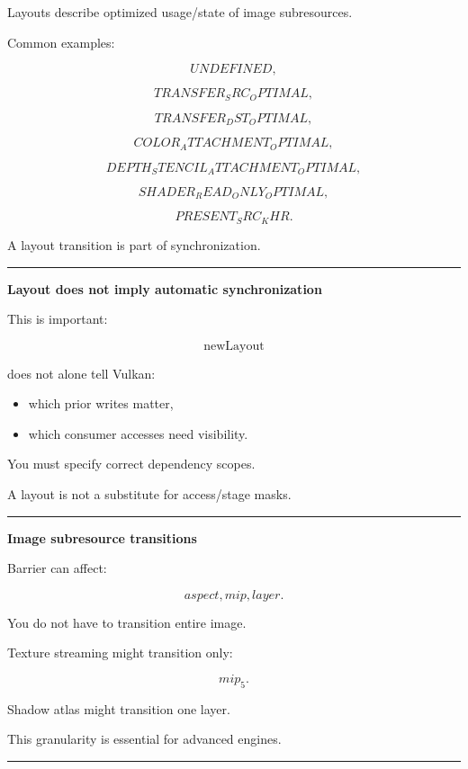 Layouts describe optimized usage/state of image subresources.

Common examples:

\[
UNDEFINED,
\]

\[
TRANSFER_SRC_OPTIMAL,
\]

\[
TRANSFER_DST_OPTIMAL,
\]

\[
COLOR_ATTACHMENT_OPTIMAL,
\]

\[
DEPTH_STENCIL_ATTACHMENT_OPTIMAL,
\]

\[
SHADER_READ_ONLY_OPTIMAL,
\]

\[
PRESENT_SRC_KHR.
\]

A layout transition is part of synchronization.

\begin{center}\rule{0.5\linewidth}{0.5pt}\end{center}

\textbf{Layout does not imply automatic synchronization}

This is important:

\[
\boxed{
\text{newLayout}
}
\]

does not alone tell Vulkan:

\begin{itemize}
\tightlist
\item
  which prior writes matter,
\item
  which consumer accesses need visibility.
\end{itemize}

You must specify correct dependency scopes.

A layout is not a substitute for access/stage masks.

\begin{center}\rule{0.5\linewidth}{0.5pt}\end{center}

\textbf{Image subresource transitions}

Barrier can affect:

\[
aspect,
mip,
layer.
\]

You do not have to transition entire image.

Texture streaming might transition only:

\[
mip_5.
\]

Shadow atlas might transition one layer.

This granularity is essential for advanced engines.

\begin{center}\rule{0.5\linewidth}{0.5pt}\end{center}

